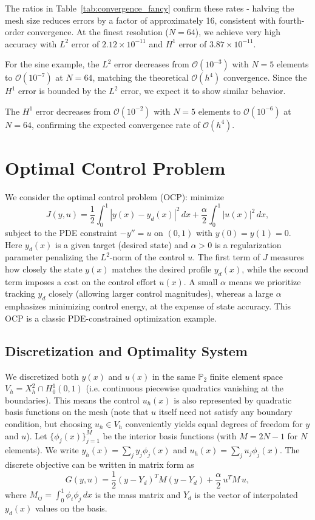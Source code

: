 \documentclass[a4paper,10pt]{article}
\begin{document}
The ratios in Table~\ref{tab:convergence_fancy} confirm these rates - halving the mesh size reduces errors by a factor of approximately 16, consistent with fourth-order convergence. At the finest resolution ($N=64$), we achieve very high accuracy with $L^2$ error of $2.12 \times 10^{-11}$ and $H^1$ error of $3.87 \times 10^{-11}$.

For the sine example, the $L^2$ error decreases from $\mathcal{O}(10^{-3})$ with $N=5$ elements to $\mathcal{O}(10^{-7})$ at $N=64$, matching the theoretical $\mathcal{O}(h^4)$ convergence. 
Since the $H^1$ error is bounded by the $L^2$ error, we expect it to show similar behavior.

The $H^1$ error decreases from $\mathcal{O}(10^{-2})$ with $N=5$ elements to $\mathcal{O}(10^{-6})$ at $N=64$, confirming the expected convergence rate of $\mathcal{O}(h^4)$.


\section{Optimal Control Problem}
\label{sec:optimal_control}
We consider the optimal control problem (OCP): minimize
\[
	J(y,u) = \frac{1}{2}\int_0^1 |y(x)-y_d(x)|^2\,dx + \frac{\alpha}{2}\int_0^1 |u(x)|^2\,dx,
\]
subject to the PDE constraint $-y'' = u$ on $(0,1)$ with $y(0)=y(1)=0$. Here $y_d(x)$ is a given target (desired state) and $\alpha>0$ is a regularization parameter penalizing the $L^2$-norm of the control $u$. The first term of $J$ measures how closely the state $y(x)$ matches the desired profile $y_d(x)$, while the second term imposes a cost on the control effort $u(x)$. A small $\alpha$ means we prioritize tracking $y_d$ closely (allowing larger control magnitudes), whereas a large $\alpha$ emphasizes minimizing control energy, at the expense of state accuracy. This OCP is a classic PDE-constrained optimization example.

\subsection{Discretization and Optimality System}

We discretized both $y(x)$ and $u(x)$ in the same $\mathbb{P}_2$ finite element space $V_h = X_h^2 \cap H_0^1(0,1)$ (i.e. continuous piecewise quadratics vanishing at the boundaries). This means the control $u_h(x)$ is also represented by quadratic basis functions on the mesh (note that $u$ itself need not satisfy any boundary condition, but choosing $u_h\in V_h$ conveniently yields equal degrees of freedom for $y$ and $u$). Let $\{\phi_j(x)\}_{j=1}^{M}$ be the interior basis functions (with $M=2N-1$ for $N$ elements). We write $y_h(x)=\sum_j y_j\phi_j(x)$ and $u_h(x)=\sum_j u_j\phi_j(x)$. The discrete objective can be written in matrix form as
\[
	G(y,u) = \frac{1}{2}(y-Y_d)^T M(y-Y_d) + \frac{\alpha}{2}\,u^T M\,u,
\]
where $M_{ij}=\int_0^1 \phi_i\phi_j\,dx$ is the mass matrix and $Y_d$ is the vector of interpolated $y_d(x)$ values on the basis.
\end{document}
